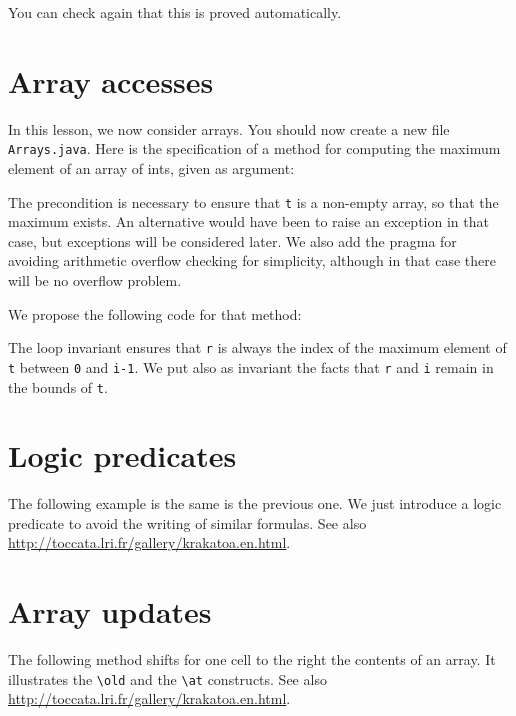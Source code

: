 \documentclass[a4paper,11pt,twoside,openright]{report}
\begin{document}
You can check again that this is proved automatically.

\section{Array accesses}

In this lesson, we now consider arrays. You should now create a new
file \verb|Arrays.java|. Here is the specification of a method for computing
the maximum element of an array of ints, given as argument:

The precondition is necessary to ensure that \verb|t| is a non-empty
array, so that the maximum exists. An alternative would have been to
raise an exception in that case, but exceptions will be considered
later. We also add the pragma for avoiding arithmetic overflow
checking for simplicity, although in that case there will be no
overflow problem.

We propose the following code for that method:

The loop invariant ensures that \verb|r| is always the index of the maximum
element of \verb|t| between \verb|0| and \verb|i-1|. We put also as
invariant the facts that \verb|r| and \verb|i| remain in the bounds of
\verb|t|.


\section{Logic predicates}


The following example is the same is the previous one. We just
introduce a logic predicate to avoid the writing of similar formulas.
See also \url{http://toccata.lri.fr/gallery/krakatoa.en.html}.




\section{Array updates}


The following method shifts for one cell to the right the contents of
an array. It illustrates the \verb|\old| and the \verb|\at|
constructs.
See also \url{http://toccata.lri.fr/gallery/krakatoa.en.html}.


\end{document}
